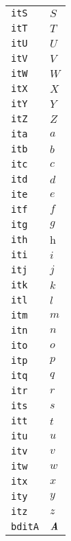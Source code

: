 \begin{longtable}{ll}
\texttt{itS}&${}{\textit{S}}{}$\\
\texttt{itT}&${}{\textit{T}}{}$\\
\texttt{itU}&${}{\textit{U}}{}$\\
\texttt{itV}&${}{\textit{V}}{}$\\
\texttt{itW}&${}{\textit{W}}{}$\\
\texttt{itX}&${}{\textit{X}}{}$\\
\texttt{itY}&${}{\textit{Y}}{}$\\
\texttt{itZ}&${}{\textit{Z}}{}$\\
\texttt{ita}&${}{\textit{a}}{}$\\
\texttt{itb}&${}{\textit{b}}{}$\\
\texttt{itc}&${}{\textit{c}}{}$\\
\texttt{itd}&${}{\textit{d}}{}$\\
\texttt{ite}&${}{\textit{e}}{}$\\
\texttt{itf}&${}{\textit{f}}{}$\\
\texttt{itg}&${}{\textit{g}}{}$\\
\texttt{ith}&${}{\textit{h}}{}$\\
\texttt{iti}&${}{\textit{i}}{}$\\
\texttt{itj}&${}{\textit{j}}{}$\\
\texttt{itk}&${}{\textit{k}}{}$\\
\texttt{itl}&${}{\textit{l}}{}$\\
\texttt{itm}&${}{\textit{m}}{}$\\
\texttt{itn}&${}{\textit{n}}{}$\\
\texttt{ito}&${}{\textit{o}}{}$\\
\texttt{itp}&${}{\textit{p}}{}$\\
\texttt{itq}&${}{\textit{q}}{}$\\
\texttt{itr}&${}{\textit{r}}{}$\\
\texttt{its}&${}{\textit{s}}{}$\\
\texttt{itt}&${}{\textit{t}}{}$\\
\texttt{itu}&${}{\textit{u}}{}$\\
\texttt{itv}&${}{\textit{v}}{}$\\
\texttt{itw}&${}{\textit{w}}{}$\\
\texttt{itx}&${}{\textit{x}}{}$\\
\texttt{ity}&${}{\textit{y}}{}$\\
\texttt{itz}&${}{\textit{z}}{}$\\
\texttt{bditA}&${}{\textbf{\textit{A}}}{}$\\

\end{longtable}
